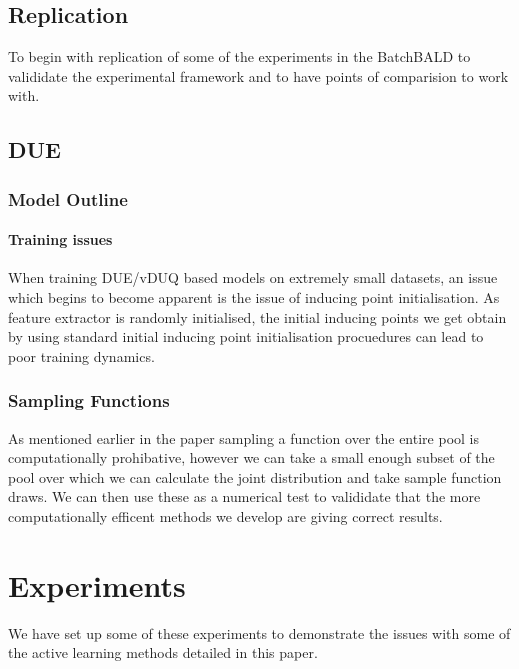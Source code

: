 \documentclass[12pt, a4paper]{report}
\theoremstyle{definition}
\begin{document}
\section{Replication}

To begin with replication of some of the experiments in the BatchBALD to valididate the experimental framework and to have points of comparision to work with.




\section{DUE}

\subsection{Model Outline}


\subsubsection{Training issues}

When training DUE/vDUQ based models on extremely small datasets, an issue which begins to become apparent is the issue of inducing point initialisation. As feature extractor is randomly initialised, the initial inducing points we get obtain by using standard initial inducing point initialisation procuedures can lead to poor training dynamics.





\subsection{Sampling Functions}

As mentioned earlier in the paper sampling a function over the entire pool is computationally prohibative, however we can take a small enough subset of the pool over which we can calculate the joint distribution and take sample function draws.
We can then use these as a numerical test to valididate that the more computationally efficent methods we develop are giving correct results.


\chapter{Experiments}

We have set up some of these experiments to demonstrate the issues with some of the active learning methods detailed in this paper.
\end{document}
